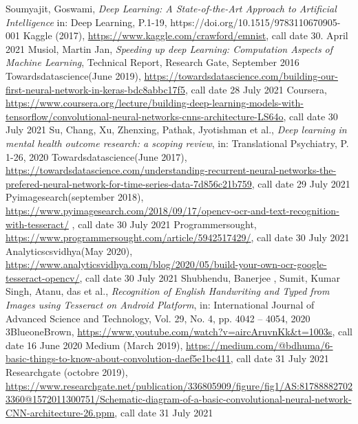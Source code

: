 \begin{thebibliography}{99}                    %
    \bibitem{[1]}
      Soumyajit,  Goswami, \emph{Deep Learning: A State-of-the-Art Approach to Artificial Intelligence} in: Deep Learning, P.1-19, https://doi.org/10.1515/9783110670905-001
    \bibitem{[2]}
      Kaggle (2017), \url{https://www.kaggle.com/crawford/emnist}, call date 30. April 2021
    \bibitem{[3]}
      Musiol, Martin Jan, \emph{Speeding up deep Learning: Computation Aspects of Machine Learning}, Technical Report, Research Gate, September 2016
    \bibitem{[4]}
      Towardsdatascience(June 2019), \url{https://towardsdatascience.com/building-our-first-neural-network-in-keras-bdc8abbc17f5}, call date 28 July 2021
    \bibitem{[5]}
      Coursera,  \url{https://www.coursera.org/lecture/building-deep-learning-models-with-tensorflow/convolutional-neural-networks-cnns-architecture-LS64o}, call date 30 July 2021
    \bibitem{[6]}
      Su, Chang,  Xu, Zhenxing, Pathak, Jyotishman et al., \emph{Deep learning in mental health outcome research: a scoping review}, in: Translational Psychiatry, P. 1-26, 2020
    \bibitem{[7]}
      Towardsdatascience(June 2017), \url{https://towardsdatascience.com/understanding-recurrent-neural-networks-the-prefered-neural-network-for-time-series-data-7d856c21b759}, call date 29 July 2021
    \bibitem{[8]}
      Pyimagesearch(september 2018), \url{https://www.pyimagesearch.com/2018/09/17/opencv-ocr-and-text-recognition-with-tesseract/} , call date 30 July 2021
    \bibitem{[9]}
      Programmersought, \url{https://www.programmersought.com/article/5942517429/}, call date 30 July 2021
    \bibitem{[10]}
      Analyticscsvidhya(May 2020), \url{https://www.analyticsvidhya.com/blog/2020/05/build-your-own-ocr-google-tesseract-opencv/}, call date 30 July 2021
    \bibitem{[11]}
      Shubhendu, Banerjee , Sumit, Kumar Singh, Atanu, das et al., \emph{Recognition of English Handwriting and Typed from Images using Tesseract on Android Platform}, 
    in: International Journal of Advanced Science and Technology, Vol. 29, No. 4, pp. 4042 – 4054, 2020   
    \bibitem{[12]}
      3BlueoneBrown, \url{https://www.youtube.com/watch?v=aircAruvnKk&t=1003s}, call date 16 June 2020
    \bibitem{[13]}
      Medium (March 2019), \url{https://medium.com/@bdhuma/6-basic-things-to-know-about-convolution-daef5e1bc411}, call date 31 July 2021
    \bibitem{[14]}
      Researchgate (octobre 2019), \url{https://www.researchgate.net/publication/336805909/figure/fig1/AS:817888827023360@1572011300751/Schematic-diagram-of-a-basic-convolutional-neural-network-CNN-architecture-26.ppm}, call date 31 July 2021
    \end{thebibliography}